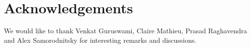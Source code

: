 \documentclass[envcountsame,oribibl]{llncs}
\begin{document}
\section*{Acknowledgements}
We would like to thank Venkat Guruswami, Claire Mathieu, Prasad Raghavendra and Alex Samorodnitsky for interesting remarks and discussions.

\nocite{Bredereck09}

  
\end{document}
